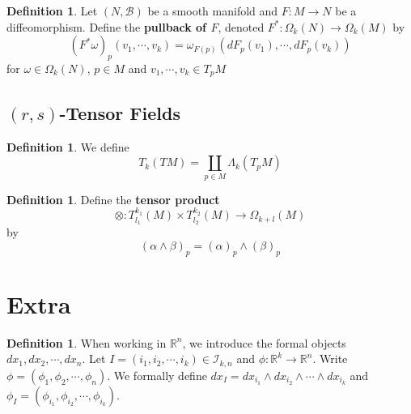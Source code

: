 \documentclass[12pt]{amsart}
\theoremstyle{definition}
\newtheorem{defn}[definition]{Definition}
\theoremstyle{definition}
\newcommand{\al}{\alpha}
\newcommand{\Lam}{\Lambda}
\newcommand{\om}{\omega}
\newcommand{\Om}{\Omega}
\newcommand{\R}{\mathbb{R}}
\newcommand{\MB}{\mathcal{B}}
\newcommand{\MI}{\mathcal{I}}
\begin{document}
	
	\begin{defn}
		Let $(N, \MB)$ be a smooth manifold and $F: M \rightarrow N$ be a diffeomorphism. Define the \textbf{pullback of $F$}, denoted $F^*: \Om_k(N) \rightarrow \Om_k(M)$ by  $$(F^* \om)_p (v_1, \cdots, v_k) = \om_{F(p)} (dF_p(v_1), \cdots, dF_p(v_k))$$ for $\om \in \Om_k(N)$, $p \in M$ and $v_1, \cdots, v_k \in T_{p}M$
	\end{defn}










	
	
	
	
	\newpage
	\subsection{$(r,s)$-Tensor Fields}
	
	\begin{defn}
	We define $$T_k (TM) = \coprod_{p \in M} \Lam_k(T_p M)$$
	\end{defn}
	
	\begin{defn}
	Define the \textbf{tensor product} $$\otimes: T^{k_1}_{l_1}(M) \times T^{k_2}_{l_2}(M) \rightarrow \Om_{k+l}(M) $$ by $$(\al \wedge \beta)_p = (\al)_p \wedge (\beta)_p$$
	\end{defn}
	
	
	
	
	
	
	
	
	
	
	
	
	
	
	
	\newpage 
	\section{Extra}
	\begin{defn}
		When working in $\R^n$, we introduce the formal objects $dx_1, dx_2, \cdots, dx_n$. Let $I = (i_1, i_2, \cdots, i_k)\in \MI_{k,n}$ and $\phi: \R^k \rightarrow \R^n$. Write $\phi = (\phi_1, \phi_2, \cdots, \phi_n)$. We formally define $dx_I = dx_{i_1}\wedge dx_{i_2} \wedge \cdots \wedge dx_{i_k}$ and $\phi_I = (\phi_{i_1}, \phi_{i_2}, \cdots, \phi_{i_k})$.   
	\end{defn}
	
\end{document}
